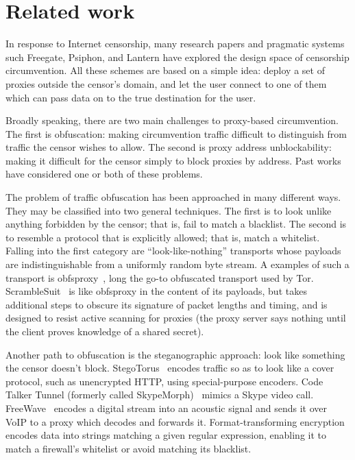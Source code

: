 \documentclass{article}
\begin{document}

\section{Related work}

In response to Internet censorship, many research papers and pragmatic systems
such Freegate, Psiphon, and Lantern have explored the design space of censorship
circumvention. All these schemes are based on a simple idea: deploy a set of
proxies outside the censor's domain, and let the user connect to one of them
which can pass data on to the true destination for the user.

Broadly speaking, there are two main challenges to proxy-based circumvention.
The first is obfuscation: making circumvention traffic difficult to distinguish
from traffic the censor wishes to allow. The second is proxy address
unblockability: making it difficult for the censor simply to block proxies by
address. Past works have considered one or both of these problems.

The problem of traffic obfuscation has been approached in many different ways.
They may be classified into two general techniques.
The first is to look unlike
anything forbidden by the censor; that is, fail to match a blacklist. The second is
to resemble a protocol that is explicitly allowed; that is, match a whitelist.
Falling into the first category are ``look-like-nothing'' transports whose
payloads are indistinguishable from a uniformly random byte stream. A examples
of such a transport is obfsproxy~\cite{obfsproxy}, long the go-to obfuscated
transport used by Tor. ScrambleSuit~\cite{scramblesuit} is like obfsproxy in the
content of its payloads, but takes additional steps to obscure its signature of
packet lengths and timing, and is designed to resist active scanning for proxies
(the proxy server says nothing until the client proves knowledge of a shared
secret).

Another path to obfuscation is the steganographic approach: look like
something the censor doesn't block. StegoTorus~\cite{stegotorus}
encodes traffic so as to look like a cover protocol, such as unencrypted HTTP,
using special-purpose encoders.
Code Talker
Tunnel (formerly called SkypeMorph)~\cite{skypemorph} mimics a Skype video call.
FreeWave~\cite{freewave} encodes a digital stream into an acoustic signal
and sends it over VoIP to a proxy which decodes and forwards it.
Format-transforming encryption~\cite{fte} encodes data into strings matching a given regular expression,
enabling it to match a firewall's whitelist or avoid matching its blacklist.
\end{document}
